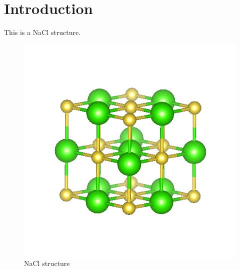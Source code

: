 \section{Introduction}\label{sec:introduction}

This is a NaCl structure\cite{kipf2016semi}.
\begin{figure}[H]
  \centering
  \includegraphics[width=0.6\columnwidth]{./fig/NaCl.png}
  \caption{NaCl structure}
\end{figure}
